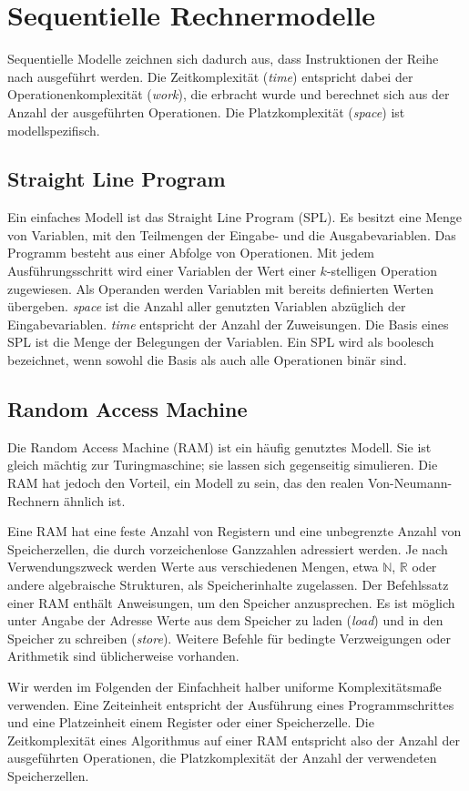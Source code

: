 \section{Sequentielle Rechnermodelle}
Sequentielle Modelle zeichnen sich dadurch aus, dass Instruktionen der Reihe
nach ausgeführt werden.
Die Zeitkomplexität (\emph{time}) entspricht dabei der Operationenkomplexität
(\emph{work}), die erbracht wurde und berechnet sich aus der Anzahl der
ausgeführten Operationen.
Die Platzkomplexität (\emph{space}) ist modellspezifisch.


\subsection{Straight Line Program}
Ein einfaches Modell ist das Straight Line Program (SPL).
Es besitzt eine Menge von Variablen, mit den Teilmengen der Eingabe- und die
Ausgabevariablen.
Das Programm besteht aus einer Abfolge von Operationen.
Mit jedem Ausführungsschritt wird einer Variablen der Wert einer $k$-stelligen
Operation zugewiesen.
Als Operanden werden Variablen mit bereits definierten Werten übergeben.
\emph{space} ist die Anzahl aller genutzten Variablen abzüglich der
Eingabevariablen.
\emph{time} entspricht der Anzahl der Zuweisungen.
Die Basis eines SPL ist die Menge der Belegungen der Variablen.
Ein SPL wird als boolesch bezeichnet, wenn sowohl die Basis als auch alle
Operationen binär sind.
\cite[S. 9]{reif}


\subsection{Random Access Machine}
Die Random Access Machine (RAM) ist ein häufig genutztes Modell.
Sie ist gleich mächtig zur Turingmaschine; sie lassen sich gegenseitig
simulieren.
Die RAM hat jedoch den Vorteil, ein Modell zu sein, das den realen
Von-Neumann-Rechnern ähnlich ist.

Eine RAM hat eine feste Anzahl von Registern und eine unbegrenzte Anzahl von
Speicherzellen, die durch vorzeichenlose Ganzzahlen adressiert werden.
Je nach Verwendungszweck werden Werte aus verschiedenen Mengen, etwa
$\mathbb{N}$, $\mathbb{R}$ oder andere algebraische Strukturen, als
Speicherinhalte zugelassen.
Der Befehlssatz einer RAM enthält Anweisungen, um den Speicher anzusprechen.
Es ist möglich unter Angabe der Adresse Werte aus dem Speicher zu laden
(\emph{load}) und in den Speicher zu schreiben (\emph{store}).
Weitere Befehle für bedingte Verzweigungen oder Arithmetik sind üblicherweise
vorhanden.

Wir werden im Folgenden der Einfachheit halber uniforme Komplexitätsmaße
verwenden.
Eine Zeiteinheit entspricht der Ausführung eines Programmschrittes
und eine Platzeinheit einem Register oder einer Speicherzelle.
Die Zeitkomplexität eines Algorithmus auf einer RAM entspricht also der Anzahl
der ausgeführten Operationen, die Platzkomplexität der Anzahl der verwendeten
Speicherzellen.
\cite[S. 9ff.]{reif}
\cite[S. 184ff.]{fgi2}

